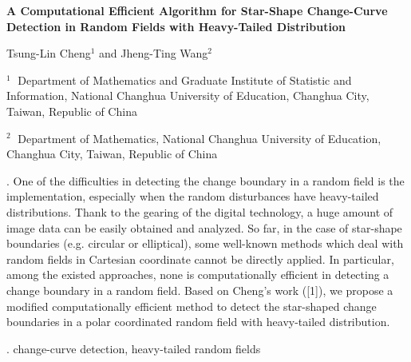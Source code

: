 \documentclass[12pt]{article}
\begin{document}
\begin{flushleft}


{\LARGE\bf A Computational Efficient Algorithm for Star-Shape
Change-Curve Detection in Random Fields with Heavy-Tailed
Distribution}


\vspace{1.0cm}

Tsung-Lin Cheng$^1$ and Jheng-Ting Wang$^2$

\begin{description}

\item $^1 \;$ Department of Mathematics and Graduate Institute of
Statistic and Information, National Changhua University of
Education, Changhua City, Taiwan, Republic of China

\item $^2 \;$ Department of Mathematics, National Changhua
University of Education, Changhua City, Taiwan, Republic of China
\end{description}

\end{flushleft}


\vspace{0.75cm}

. One of the difficulties in detecting the
change boundary in a random field
 is the implementation, especially when the random disturbances have
 heavy-tailed distributions. Thank to the gearing of the digital technology, a huge amount of image
 data can be easily obtained and analyzed.
 So far, in the case of star-shape boundaries (e.g. circular or  elliptical), some well-known methods
 which deal with random fields in Cartesian coordinate cannot be directly
 applied. In particular, among the existed approaches, none is
 computationally efficient in detecting a change boundary in a
 random field. Based on Cheng's work ([1]), we propose a modified computationally efficient method to detect the star-shaped change boundaries
 in a polar coordinated random field with heavy-tailed
 distribution.

\vskip 2mm

. change-curve detection, heavy-tailed
random fields
\end{document}
